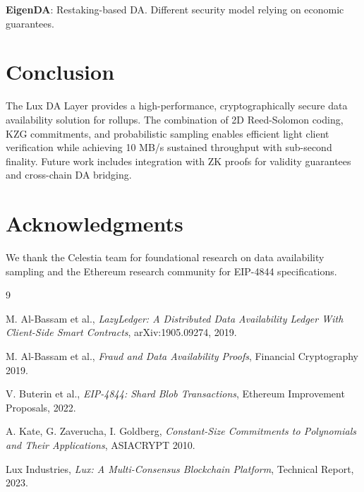 \documentclass[11pt,a4paper]{article}
\begin{document}
\textbf{EigenDA}: Restaking-based DA. Different security model relying on economic guarantees.

\section{Conclusion}

The Lux DA Layer provides a high-performance, cryptographically secure data availability solution for rollups. The combination of 2D Reed-Solomon coding, KZG commitments, and probabilistic sampling enables efficient light client verification while achieving 10 MB/s sustained throughput with sub-second finality. Future work includes integration with ZK proofs for validity guarantees and cross-chain DA bridging.

\section*{Acknowledgments}

We thank the Celestia team for foundational research on data availability sampling and the Ethereum research community for EIP-4844 specifications.


\begin{thebibliography}{9}

 M. Al-Bassam et al., \textit{LazyLedger: A Distributed Data Availability Ledger With Client-Side Smart Contracts}, arXiv:1905.09274, 2019.

 M. Al-Bassam et al., \textit{Fraud and Data Availability Proofs}, Financial Cryptography 2019.

 V. Buterin et al., \textit{EIP-4844: Shard Blob Transactions}, Ethereum Improvement Proposals, 2022.

 A. Kate, G. Zaverucha, I. Goldberg, \textit{Constant-Size Commitments to Polynomials and Their Applications}, ASIACRYPT 2010.

 Lux Industries, \textit{Lux: A Multi-Consensus Blockchain Platform}, Technical Report, 2023.

\end{thebibliography}
\end{document}
